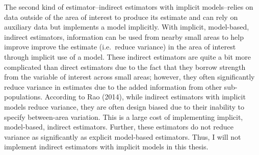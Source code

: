 \documentclass[12pt,twoside]{reedthesis}
\begin{document}
The second kind of estimator--indirect estimators with implicit models--relies on data outside of the area of interest to produce its estimate and can rely on auxiliary data but implements a model implicitly. With implicit, model-based, indirect estimators, information can be used from nearby small areas to help improve improve the estimate (i.e.~reduce variance) in the area of interest through implicit use of a model. These indirect estimators are quite a bit more complicated than direct estimators due to the fact that they borrow strength from the variable of interest across small areas; however, they often significantly reduce variance in estimates due to the added information from other sub-populations. According to Rao (2014), while indirect estimators with implicit models reduce variance, they are often design biased due to their inability to specify between-area variation. This is a large cost of implementing implicit, model-based, indirect estimators. Further, these estimators do not reduce variance as significantly as explicit model-based estimators. Thus, I will not implement indirect estimators with implicit models in this thesis.
\end{document}
